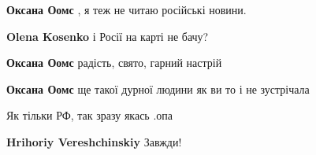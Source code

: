 \begin{itemize}
\begin{itemize}
 
\textbf{Оксана Оомс} , я теж не читаю російські новини.

\begin{itemize}
 
\textbf{Olena Kosenko} і Росії на карті не бачу?
\end{itemize}

 
\textbf{Оксана Оомс} радість, свято, гарний настрій

 
\textbf{Оксана Оомс} ще такої дурної людини як ви то і не зустрічала

\end{itemize}

 
Як тільки РФ, так зразу якась .опа

\begin{itemize}
 
\textbf{Hrihoriy Vereshchinskiy} Завжди!


\end{itemize}
\end{itemize}
